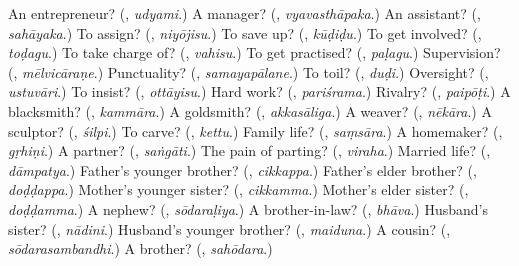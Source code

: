 \begin{tcolorbox}[breakable,colback=teal!4,colframe=teal!35!black,title={Before you move on}]
An entrepreneur? (\textbf{}, \emph{udyami}.) A manager? (\textbf{}, \emph{vyavasthāpaka}.) An assistant? (\textbf{}, \emph{sahāyaka}.) To assign? (\textbf{}, \emph{niyōjisu}.) To save up? (\textbf{}, \emph{kūḍiḍu}.) To get involved? (\textbf{}, \emph{toḍagu}.) To take charge of? (\textbf{}, \emph{vahisu}.) To get practised? (\textbf{}, \emph{paḷagu}.) Supervision? (\textbf{}, \emph{mēlvicāraṇe}.) Punctuality? (\textbf{}, \emph{samayapālane}.) To toil? (\textbf{}, \emph{duḍi}.) Oversight? (\textbf{}, \emph{ustuvāri}.) To insist? (\textbf{}, \emph{ottāyisu}.) Hard work? (\textbf{}, \emph{pariśrama}.) Rivalry? (\textbf{}, \emph{paipōṭi}.) A blacksmith? (\textbf{}, \emph{kammāra}.) A goldsmith? (\textbf{}, \emph{akkasāliga}.) A weaver? (\textbf{}, \emph{nēkāra}.) A sculptor? (\textbf{}, \emph{śilpi}.) To carve? (\textbf{}, \emph{kettu}.) Family life? (\textbf{}, \emph{saṃsāra}.) A homemaker? (\textbf{}, \emph{gṛhiṇi}.) A partner? (\textbf{}, \emph{saṅgāti}.) The pain of parting? (\textbf{}, \emph{viraha}.) Married life? (\textbf{}, \emph{dāmpatya}.) Father's younger brother? (\textbf{}, \emph{cikkappa}.) Father's elder brother? (\textbf{}, \emph{doḍḍappa}.) Mother's younger sister? (\textbf{}, \emph{cikkamma}.) Mother's elder sister? (\textbf{}, \emph{doḍḍamma}.) A nephew? (\textbf{}, \emph{sōdaraḷiya}.) A brother-in-law? (\textbf{}, \emph{bhāva}.) Husband's sister? (\textbf{}, \emph{nādini}.) Husband's younger brother? (\textbf{}, \emph{maiduna}.) A cousin? (\textbf{}, \emph{sōdarasambandhi}.) A brother? (\textbf{}, \emph{sahōdara}.)
\end{tcolorbox}
